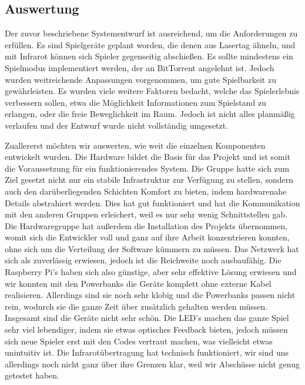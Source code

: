 \subsection{Auswertung}
\label{sec:auswertung}

Der zuvor beschriebene Systementwurf ist ausreichend, um die Anforderungen zu
erfüllen. Es sind Spielgeräte geplant worden, die denen aus Lasertag ähneln,
und mit Infrarot können sich Spieler gegenseitig abschießen. Es sollte mindestens ein
Spielmodus implementiert werden, der an BitTorrent angelehnt ist. Jedoch
wurden weitreichende Anpassungen vorgenommen, um gute Spielbarkeit zu gewährleisten. Es wurden viele weitere
Faktoren bedacht, welche das Spielerlebnis verbessern sollen, etwa die
Möglichkeit Informationen zum Spielstand zu erlangen, oder die freie
Beweglichkeit im Raum. Jedoch ist nicht alles planmäßig verlaufen und der
Entwurf wurde nicht vollständig umgesetzt.

Zuallererst möchten wir auswerten, wie weit die einzelnen Komponenten
entwickelt wurden. Die Hardware bildet die Basis für das Projekt und ist somit
die Voraussetzung für ein funktionierendes System. Die Gruppe hatte sich zum
Ziel gesetzt nicht nur ein stabile Infrastruktur zur Verfügung zu stellen,
sondern auch den darüberliegenden Schichten Komfort zu bieten, indem
hardwarenahe Details abstrahiert werden. Dies hat gut funktioniert und hat die
Kommunikation mit den anderen Gruppen erleichert, weil es nur sehr wenig
Schnittstellen gab. Die Hardwaregruppe hat außerdem die Installation des 
Projekts übernommen, womit sich die Entwickler voll und ganz auf ihre Arbeit
konzentrieren konnten, ohne sich um die Verteilung der Software kümmern zu
müssen. Das Netzwerk hat sich als zuverlässig erwiesen, jedoch ist die
Reichweite noch ausbaufähig. Die Raspberry Pi's haben sich also günstige, aber
sehr effektive Lösung erwiesen und wir konnten mit den Powerbanks die
Geräte komplett ohne externe Kabel realisieren. Allerdings sind sie noch sehr
klobig und die Powerbanks passen nicht rein, wodurch sie die ganze Zeit über
zusätzlich gehalten werden müssen. Insgesamt sind die Geräte nicht sehr schön.
Die LED's machen das ganze Spiel sehr viel lebendiger, indem sie etwas
optisches Feedback bieten, jedoch müssen sich neue Spieler erst mit den Codes
vertraut machen, was vielleicht etwas unintuitiv ist. Die Infrarotübertragung
hat technisch funktioniert, wir sind uns allerdings noch nicht ganz über ihre
Grenzen klar, weil wir Abschüsse nicht genug getestet haben.

